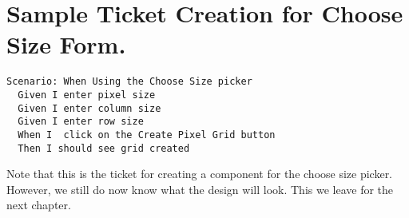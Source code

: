 \section{ Sample Ticket Creation for Choose Size Form. }
\begin{verbatim}
Scenario: When Using the Choose Size picker
  Given I enter pixel size
  Given I enter column size
  Given I enter row size
  When I  click on the Create Pixel Grid button
  Then I should see grid created
\end{verbatim}

Note that this is the ticket for creating a component for the choose size picker.
However, we still do now know what the design will look. This we leave for the
next chapter.
